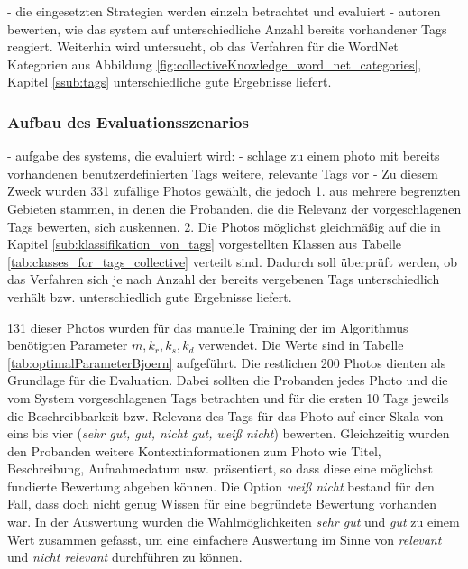 - die eingesetzten Strategien werden einzeln betrachtet und evaluiert
- autoren bewerten, wie das system auf unterschiedliche Anzahl bereits vorhandener Tags reagiert. Weiterhin wird untersucht, ob das Verfahren für die WordNet Kategorien aus Abbildung \ref{fig:collectiveKnowledge_word_net_categories}, Kapitel \ref{ssub:tags} unterschiedliche gute Ergebnisse liefert.

\subsubsection{Aufbau des Evaluationsszenarios} %
\label{ssub:aufbau_des_evaluationsszenarios}
  - aufgabe des systems, die evaluiert wird:
    - schlage zu einem photo mit bereits vorhandenen benutzerdefinierten Tags weitere, relevante Tags vor
  - Zu diesem Zweck wurden 331 zufällige Photos gewählt, die jedoch 1. aus mehrere begrenzten Gebieten stammen, in denen die Probanden, die die Relevanz der vorgeschlagenen Tags bewerten, sich auskennen.
  2. Die Photos möglichst gleichmäßig auf die in Kapitel \ref{sub:klassifikation_von_tags} vorgestellten Klassen aus Tabelle \ref{tab:classes_for_tags_collective} verteilt sind. Dadurch soll überprüft werden, ob das Verfahren sich je nach Anzahl der bereits vergebenen Tags unterschiedlich verhält bzw. unterschiedlich gute Ergebnisse liefert.
  
  131 dieser Photos wurden für das manuelle Training der im Algorithmus benötigten Parameter $m,	k_r,	k_s, k_d $ verwendet. Die Werte sind in Tabelle \ref{tab:optimalParameterBjoern} aufgeführt. Die restlichen 200 Photos dienten als Grundlage für die Evaluation. Dabei sollten die Probanden jedes Photo und die vom System vorgeschlagenen Tags betrachten und für die ersten 10 Tags jeweils die Beschreibbarkeit bzw. Relevanz des Tags für das Photo auf einer Skala von eins bis vier (\emph{sehr gut, gut, nicht gut, weiß nicht}) bewerten. Gleichzeitig wurden den Probanden weitere Kontextinformationen zum Photo wie Titel, Beschreibung, Aufnahmedatum usw. präsentiert, so dass diese eine möglichst fundierte Bewertung abgeben können. Die Option \emph{weiß nicht} bestand für den Fall, dass doch nicht genug Wissen für eine begründete Bewertung vorhanden war. In der Auswertung wurden die Wahlmöglichkeiten \emph{sehr gut} und \emph{gut} zu einem Wert zusammen gefasst, um eine einfachere Auswertung im Sinne von \emph{relevant} und \emph{nicht relevant} durchführen zu können.
  
